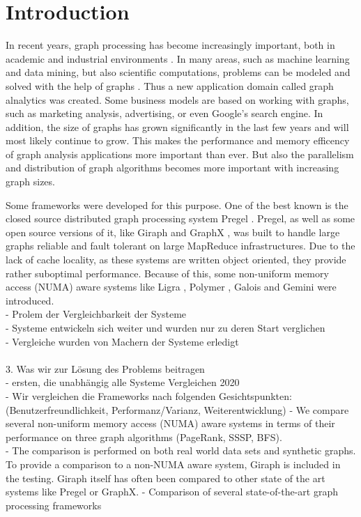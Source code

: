 \section{Introduction}

In recent years, graph processing has become increasingly important, both in academic and industrial environments \cite{Gemini}.
In many areas, such as machine learning and data mining, but also scientific computations, problems can be modeled and solved with the help of graphs \cite{Polymer}.
Thus a new application domain called graph alnalytics was created.
Some business models are based on working with graphs, such as marketing analysis, advertising, or even Google's search engine.
In addition, the size of graphs has grown significantly in the last few years and will most likely continue to grow.
This makes the performance and memory efficency of graph analysis applications more important than ever.
But also the parallelism and distribution of graph algorithms becomes more important with increasing graph sizes.

Some frameworks were developed for this purpose.
One of the best known is the closed source distributed graph processing system Pregel \cite{pregel}.
Pregel, as well as some open source versions of it, like Giraph \cite{Giraph} and GraphX \cite{graphx}, was built to handle large graphs reliable and fault tolerant on large MapReduce infrastructures.
Due to the lack of cache locality, as these systems are written object oriented, they provide rather suboptimal performance.
Because of this, some non-uniform memory access (NUMA) aware systems like Ligra \cite{Ligra}, Polymer \cite{Polymer}, Galois \cite{Galois} and Gemini \cite{Gemini} were introduced.
\\
- Prolem der Vergleichbarkeit der Systeme\\
- Systeme entwickeln sich weiter und wurden nur zu deren Start verglichen\\
- Vergleiche wurden von Machern der Systeme erledigt\\
\\
3. Was wir zur Lösung des Problems beitragen\\
- ersten, die unabhängig alle Systeme Vergleichen 2020\\
- Wir vergleichen die Frameworks nach folgenden Gesichtspunkten:\\
(Benutzerfreundlichkeit, Performanz/Varianz, Weiterentwicklung)
- We compare several non-uniform memory access (NUMA) aware systems in terms of their performance on three graph algorithms (PageRank, SSSP, BFS).\\
- The comparison is performed on both real world data sets and synthetic graphs.
To provide a comparison to a non-NUMA aware system, Giraph\cite{Giraph} is included in the testing. Giraph itself has often been compared to other state of the art systems like Pregel or GraphX.
- Comparison of several state-of-the-art graph processing frameworks\\
\\




